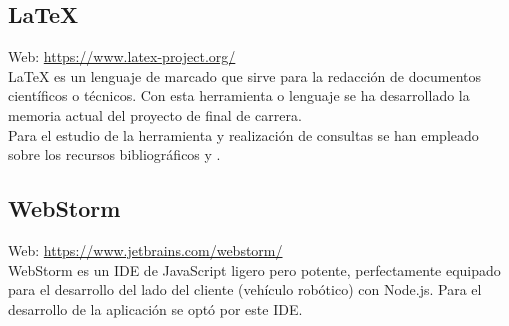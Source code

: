 \subsection{\LaTeX}

Web: \url{https://www.latex-project.org/}\\

\LaTeX \: es un lenguaje de marcado que sirve para la redacción de documentos científicos o técnicos. Con esta herramienta o lenguaje se ha desarrollado la memoria actual del proyecto de final de carrera.\\

Para el estudio de la herramienta y realización de consultas se han empleado sobre los recursos bibliográficos \cite{book:LaTeX} y \cite{website:6}.\\


\subsection{WebStorm}


Web: \url{https://www.jetbrains.com/webstorm/}\\

WebStorm es un IDE de JavaScript ligero pero potente, perfectamente equipado para el desarrollo del lado del cliente (vehículo robótico) con Node.js. Para el desarrollo de la aplicación se optó por este IDE. \\

